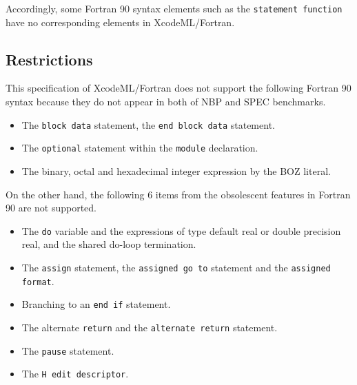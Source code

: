 Accordingly, some Fortran 90 syntax elements such as the {\tt statement function} have no corresponding elements in XcodeML/Fortran.

\subsection{Restrictions}

This specification of XcodeML/Fortran does not support the following Fortran 90 syntax because they do not appear in both of NBP and SPEC benchmarks.

\begin{itemize}
\item The {\tt block data} statement, the {\tt end block data} statement.
\item The {\tt optional} statement within the {\tt module} declaration.
\item The binary, octal and hexadecimal integer expression by the BOZ literal.
\end{itemize}

On the other hand, the following 6 items from the obsolescent features in Fortran 90 are not supported.

\begin{itemize}
\item The {\tt do} variable and the expressions of type default real or double precision real, and the shared do-loop termination.
\item The {\tt assign} statement, the {\tt assigned go to} statement and the {\tt assigned format}.
\item Branching to an {\tt end if} statement.
\item The alternate {\tt return} and the {\tt alternate return} statement.
\item The {\tt pause} statement.
\item The {\tt H edit descriptor}.
\end{itemize}



